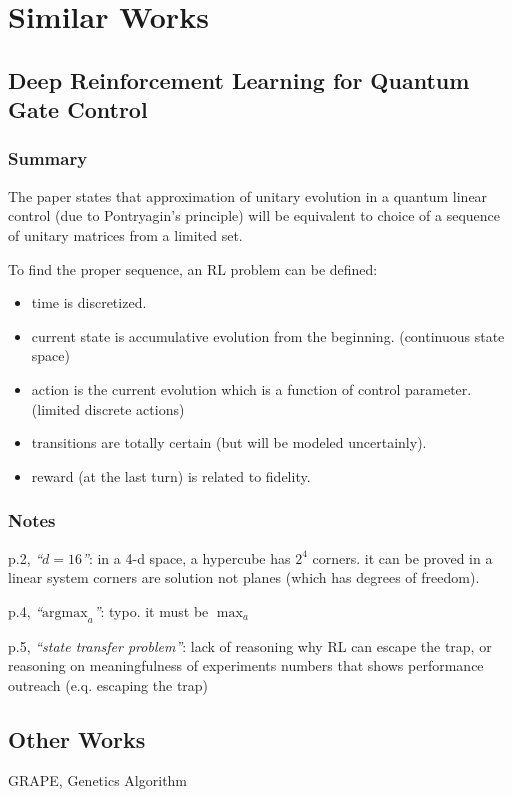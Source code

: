 \documentclass{article}
\def\ind{\hspace{\parindent}}
\begin{document}
\section{Similar Works}
\subsection{Deep Reinforcement Learning for Quantum Gate Control}
\subsubsection{Summary}
The paper states that approximation of unitary evolution in a quantum linear control (due to Pontryagin's principle) will be equivalent to choice of a sequence of unitary matrices from a limited set.

To find the proper sequence, an RL problem can be defined:
\begin{itemize}
  \item time is discretized.
  \item current state is accumulative evolution from the beginning. (continuous state space)
  \item action is the current evolution which is a function of control parameter. (limited discrete actions)
  \item transitions are totally certain (but will be modeled uncertainly).
  \item reward (at the last turn) is related to fidelity.
\end{itemize}

\subsubsection{Notes}
\ind p.2, \emph{``$d=16$''}: in a 4-d space, a hypercube has $2^4$ corners. it can be proved in a linear system corners are solution not planes (which has degrees of freedom).

p.4, \emph{``$\text{argmax}_a$''}: typo. it must be $\max_a$

p.5, \emph{``state transfer problem''}: lack of reasoning why RL can escape the trap, or reasoning on meaningfulness of experiments numbers that shows performance outreach (e.q. escaping the trap) 


\subsection{Other Works}
GRAPE, Genetics Algorithm
\end{document}
